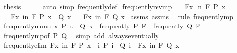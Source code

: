 \begin{isabellebody}
\ {\isacharquery}{\kern0pt}thesis\isanewline
\ \ \ \ \isamarkupfalse%
\ {\isacharparenleft}{\kern0pt}auto\ simp{\isacharcolon}{\kern0pt}\ frequently{\isacharunderscore}{\kern0pt}def{\isacharparenright}{\kern0pt}\isanewline
{}\isamarkupfalse%
%
\endisatagproof
{\isafoldproof}%
%
\isadelimproof
\isanewline
%
\endisadelimproof
\isanewline
{}\isamarkupfalse%
\ frequently{\isacharunderscore}{\kern0pt}rev{\isacharunderscore}{\kern0pt}mp{\isacharcolon}{\kern0pt}\isanewline
\ \ \ {\isachardoublequoteopen}{\isasymexists}\isactrlsub Fx\ in\ F{\isachardot}{\kern0pt}\ P\ x{\isachardoublequoteclose}\isanewline
\ \ \ {\isachardoublequoteopen}{\isasymforall}\isactrlsub Fx\ in\ F{\isachardot}{\kern0pt}\ P\ x\ {\isasymlongrightarrow}\ Q\ x{\isachardoublequoteclose}\isanewline
\ \ \ {\isachardoublequoteopen}{\isasymexists}\isactrlsub Fx\ in\ F{\isachardot}{\kern0pt}\ Q\ x{\isachardoublequoteclose}\isanewline
%
\isadelimproof
%
\endisadelimproof
%
\isatagproof
{}\isamarkupfalse%
\ assms{\isacharparenleft}{\kern0pt}{}{\isacharparenright}{\kern0pt}\ assms{\isacharparenleft}{\kern0pt}{}{\isacharparenright}{\kern0pt}\ \isamarkupfalse%
\ {\isacharparenleft}{\kern0pt}rule\ frequently{\isacharunderscore}{\kern0pt}mp{\isacharparenright}{\kern0pt}%
\endisatagproof
{\isafoldproof}%
%
\isadelimproof
\isanewline
%
\endisadelimproof
\isanewline
{}\isamarkupfalse%
\ frequently{\isacharunderscore}{\kern0pt}mono{\isacharcolon}{\kern0pt}\ {\isachardoublequoteopen}{\isacharparenleft}{\kern0pt}{\isasymforall}x{\isachardot}{\kern0pt}\ P\ x\ {\isasymlongrightarrow}\ Q\ x{\isacharparenright}{\kern0pt}\ {\isasymLongrightarrow}\ frequently\ P\ F\ {\isasymLongrightarrow}\ frequently\ Q\ F{\isachardoublequoteclose}\isanewline
%
\isadelimproof
\ \ %
\endisadelimproof
%
\isatagproof
{}\isamarkupfalse%
\ frequently{\isacharunderscore}{\kern0pt}mp{\isacharbrackleft}{\kern0pt}of\ P\ Q{\isacharbrackright}{\kern0pt}\ \isamarkupfalse%
\ {\isacharparenleft}{\kern0pt}simp\ add{\isacharcolon}{\kern0pt}\ always{\isacharunderscore}{\kern0pt}eventually{\isacharparenright}{\kern0pt}%
\endisatagproof
{\isafoldproof}%
%
\isadelimproof
\isanewline
%
\endisadelimproof
\isanewline
{}\isamarkupfalse%
\ frequently{\isacharunderscore}{\kern0pt}elim{}{\isacharcolon}{\kern0pt}\ {\isachardoublequoteopen}{\isasymexists}\isactrlsub Fx\ in\ F{\isachardot}{\kern0pt}\ P\ x\ {\isasymLongrightarrow}\ {\isacharparenleft}{\kern0pt}{\isasymAnd}i{\isachardot}{\kern0pt}\ P\ i\ {\isasymLongrightarrow}\ Q\ i{\isacharparenright}{\kern0pt}\ {\isasymLongrightarrow}\ {\isasymexists}\isactrlsub Fx\ in\ F{\isachardot}{\kern0pt}\ Q\ x{\isachardoublequoteclose}\isanewline

\end{isabellebody}
